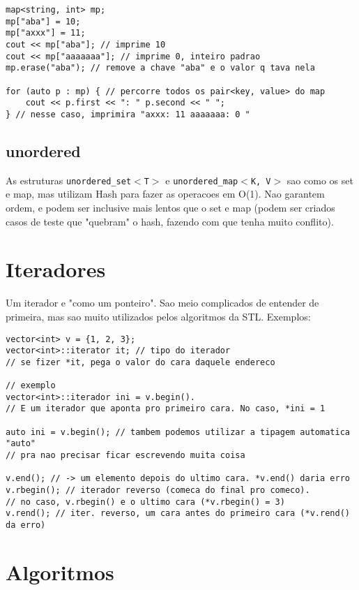 \begin{lstlisting}
map<string, int> mp;
mp["aba"] = 10;
mp["axxx"] = 11;
cout << mp["aba"]; // imprime 10
cout << mp["aaaaaaa"]; // imprime 0, inteiro padrao
mp.erase("aba"); // remove a chave "aba" e o valor q tava nela

for (auto p : mp) { // percorre todos os pair<key, value> do map
	cout << p.first << ": " p.second << " ";
} // nesse caso, imprimira "axxx: 11 aaaaaaa: 0 "
\end{lstlisting}

\subsection{unordered}

As estruturas \texttt{unordered\_set$<$T$>$} e \texttt{unordered\_map$<$K, V$>$} sao como os set e map, mas utilizam Hash para fazer as operacoes em O(1). Nao garantem ordem, e podem ser inclusive mais lentos que o set e map (podem ser criados casos de teste que "quebram" o hash, fazendo com que tenha muito conflito).

\section{Iteradores}
    
Um iterador e "como um ponteiro". Sao meio complicados de entender de primeira, mas sao muito utilizados pelos algoritmos da STL. Exemplos:

\begin{lstlisting}
vector<int> v = {1, 2, 3};
vector<int>::iterator it; // tipo do iterador
// se fizer *it, pega o valor do cara daquele endereco

// exemplo
vector<int>::iterador ini = v.begin().
// E um iterador que aponta pro primeiro cara. No caso, *ini = 1

auto ini = v.begin(); // tambem podemos utilizar a tipagem automatica "auto"
// pra nao precisar ficar escrevendo muita coisa

v.end(); // -> um elemento depois do ultimo cara. *v.end() daria erro
v.rbegin(); // iterador reverso (comeca do final pro comeco).
// no caso, v.rbegin() e o ultimo cara (*v.rbegin() = 3)
v.rend(); // iter. reverso, um cara antes do primeiro cara (*v.rend() da erro)
\end{lstlisting}

\section{Algoritmos}

